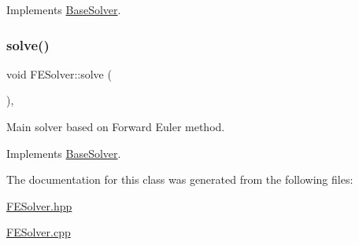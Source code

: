 Implements \hyperlink{classBaseSolver_a66b4a8e6b6e0bb2f3564b2df849c79aa}{Base\+Solver}.

\mbox{\label{classFESolver_ac6ac17db7001191c7bb32c3e8ce74d55}} 
\subsubsection{\texorpdfstring{solve()}{solve()}}
{\footnotesize\ttfamily void F\+E\+Solver\+::solve (\begin{DoxyParamCaption}{ }\end{DoxyParamCaption})\hspace{0.3cm}{\ttfamily [override]}, {\ttfamily [virtual]}}



Main solver based on Forward Euler method. 



Implements \hyperlink{classBaseSolver_a57f3b4ddec8693c61917aa37a2bac660}{Base\+Solver}.



The documentation for this class was generated from the following files\+:\begin{DoxyCompactItemize}
\item 
\hyperlink{FESolver_8hpp}{F\+E\+Solver.\+hpp}\item 
\hyperlink{FESolver_8cpp}{F\+E\+Solver.\+cpp}\end{DoxyCompactItemize}
